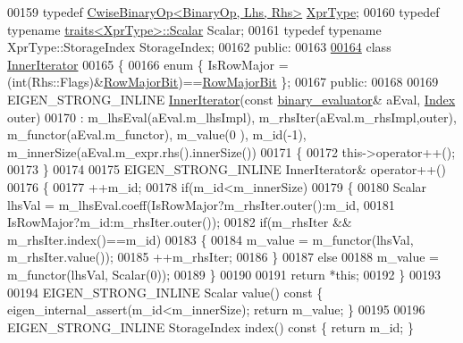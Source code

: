 \begin{DoxyCode}
00159   \textcolor{keyword}{typedef} \hyperlink{group___core___module_class_eigen_1_1_cwise_binary_op}{CwiseBinaryOp<BinaryOp, Lhs, Rhs>} 
      \hyperlink{group___core___module_class_eigen_1_1_cwise_binary_op}{XprType};
00160   \textcolor{keyword}{typedef} \textcolor{keyword}{typename} \hyperlink{struct_eigen_1_1internal_1_1traits}{traits<XprType>::Scalar} Scalar;
00161   \textcolor{keyword}{typedef} \textcolor{keyword}{typename} XprType::StorageIndex StorageIndex;
00162 \textcolor{keyword}{public}:
00163 
\hyperlink{class_eigen_1_1internal_1_1binary__evaluator_3_01_cwise_binary_op_3_01_binary_op_00_01_lhs_00_01e8cca8cc02c9e5385773e158b41ea484}{00164}   \textcolor{keyword}{class }\hyperlink{class_eigen_1_1_inner_iterator}{InnerIterator}
00165   \{
00166     \textcolor{keyword}{enum} \{ IsRowMajor = (int(Rhs::Flags)&\hyperlink{group__flags_gae4f56c2a60bbe4bd2e44c5b19cbe8762}{RowMajorBit})==\hyperlink{group__flags_gae4f56c2a60bbe4bd2e44c5b19cbe8762}{RowMajorBit} \};
00167   \textcolor{keyword}{public}:
00168 
00169     EIGEN\_STRONG\_INLINE \hyperlink{class_eigen_1_1_inner_iterator}{InnerIterator}(\textcolor{keyword}{const} \hyperlink{struct_eigen_1_1internal_1_1binary__evaluator}{binary\_evaluator}& aEval, 
      \hyperlink{namespace_eigen_a62e77e0933482dafde8fe197d9a2cfde}{Index} outer)
00170       : m\_lhsEval(aEval.m\_lhsImpl), m\_rhsIter(aEval.m\_rhsImpl,outer), m\_functor(aEval.m\_functor), m\_value(0
      ), m\_id(-1), m\_innerSize(aEval.m\_expr.rhs().innerSize())
00171     \{
00172       this->operator++();
00173     \}
00174 
00175     EIGEN\_STRONG\_INLINE InnerIterator& operator++()
00176     \{
00177       ++m\_id;
00178       \textcolor{keywordflow}{if}(m\_id<m\_innerSize)
00179       \{
00180         Scalar lhsVal = m\_lhsEval.coeff(IsRowMajor?m\_rhsIter.outer():m\_id,
00181                                         IsRowMajor?m\_id:m\_rhsIter.outer());
00182         \textcolor{keywordflow}{if}(m\_rhsIter && m\_rhsIter.index()==m\_id)
00183         \{
00184           m\_value = m\_functor(lhsVal, m\_rhsIter.value());
00185           ++m\_rhsIter;
00186         \}
00187         \textcolor{keywordflow}{else}
00188           m\_value = m\_functor(lhsVal, Scalar(0));
00189       \}
00190 
00191       \textcolor{keywordflow}{return} *\textcolor{keyword}{this};
00192     \}
00193 
00194     EIGEN\_STRONG\_INLINE Scalar value()\textcolor{keyword}{ const }\{ eigen\_internal\_assert(m\_id<m\_innerSize); \textcolor{keywordflow}{return} m\_value; \}
00195 
00196     EIGEN\_STRONG\_INLINE StorageIndex index()\textcolor{keyword}{ const }\{ \textcolor{keywordflow}{return} m\_id; \}

\end{DoxyCode}
